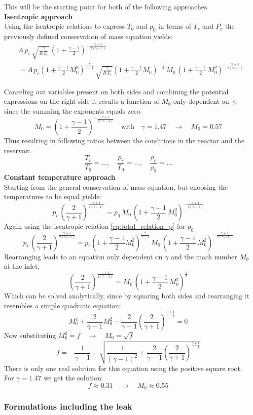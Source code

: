 This will be the starting point for both of the following approaches.\\
\textbf{Isentropic approach}\\
Using the isentropic relations to express $T_0$ and $p_0$ in terms of $T_r$ and $P_r$ the previously defined conservation of mass equation yields:
\begin{align*}
	&A\, p_r\, \sqrt{\frac{\gamma}{R\,T_r}}\,\left(1+\frac{\gamma-1}{2}\right)^{-\frac{\gamma+1}{2(\gamma-1)}}\\
	&= A\, p_r\left(1 + \frac{\gamma - 1}{2}M_0^2\right)^{\frac{\gamma}{\gamma-1}}\, \sqrt{\frac{\gamma}{R\,T_r}}\left(1 + \frac{\gamma - 1}{2}M_0\right)^{-\frac{1}{2}}\, M_0\,\left(1+\frac{\gamma-1}{2}\,M_0^2\right)^{-\frac{\gamma+1}{2(\gamma-1)}}\\\\
\end{align*}
Canceling out variables present on both sides and combining the potential expressions on the right side it results a function of $M_0$ only dependent on $\gamma$, since the summing the exponents equals zero.
$$
	M_0 = (1 + \frac{\gamma - 1}{2})^{-\frac{\gamma + 1}{2(\gamma - 1)}}
	\quad \text{with} \quad \gamma = 1.47 \quad \to \quad
	M_0 = 0.57
$$
Thus resulting in following ratios between the conditions in the reactor and the reservoir.
$$
	\frac{T_r}{T_0} = ... , \quad \frac{p_r}{T_0} = ... , \quad \frac{\rho_r}{\rho_0} = ...
$$
\textbf{Constant temperature approach}\\
Starting from the general conservation of mass equation, but choosing the temperatures to be equal yields:
$$
	p_r\, \left(\frac{2}{\gamma+1}\right)^{\frac{\gamma+1}{2(\gamma-1)}}
	=  p_0\, M_0\,\left(1+\frac{\gamma-1}{2}\,M_0^2\right)^{-\frac{\gamma+1}{2(\gamma-1)}}
$$
Again using the isentropic relation \eqref{eq:total_relation_p} for $p_0$
$$
	p_r\, \left(\frac{2}{\gamma+1}\right)^{\frac{\gamma+1}{2(\gamma-1)}}
	=  p_r \left(1 + \frac{\gamma - 1}{2}M_0^2 \right)^{\frac{\gamma}{\gamma - 1}}\, M_0\,\left(1+\frac{\gamma-1}{2}\,M_0^2\right)^{-\frac{\gamma+1}{2(\gamma-1)}}
$$
Rearranging leads to an equation only dependent on $\gamma$ and the mach number $M_0$ at the inlet.
$$
	\left(\frac{2}{\gamma+1}\right)^{\frac{\gamma+1}{2(\gamma-1)}}
	=  M_0\,\left(1+\frac{\gamma-1}{2}\,M_0^2\right)^{\frac{1}{2}}
$$
Which can be solved analytically, since by squaring both sides and rearranging it resembles a simple quadratic equation:
$$
	M_0^4 + \frac{2}{\gamma - 1}M_0^2 - \frac{2}{\gamma -1}\left(\frac{2}{\gamma + 1}\right)^{\frac{\gamma + 1}{\gamma - 1}} = 0
$$
Now substituting $M_0^2 = f \quad \to \quad M_0 = \sqrt{f}$
$$
	f = -\frac{1}{\gamma - 1} \pm \sqrt{\frac{1}{(\gamma - 1)^2}
	+ \frac{2}{\gamma -1}\left(\frac{2}{\gamma + 1}\right)^{\frac{\gamma + 1}{\gamma - 1}}}
$$
There is only one real solution for this equation using the positive square root.
For $\gamma = 1.47$ we get the solution:
$$
	f \approx 0.31 \quad \to \quad M_0 \approx 0.55
$$

\subsubsection*{Formulations including the leak}
